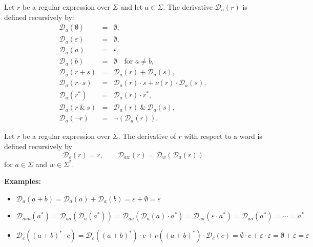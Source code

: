 \begin{definition}\label{def:regex-symbol-derivative}
Let \(r\) be a regular expression over \(\Sigma\) and let \(a\in\Sigma\).
The derivative \(\mathcal D_a(r)\) is defined recursively by:
\[
\begin{array}{rcl}
    \mathcal{D}_a(\emptyset) &=& \emptyset,\\[0.5ex]
    \mathcal{D}_a(\varepsilon) &=& \emptyset,\\[0.5ex]
    \mathcal{D}_a(a) &=& \varepsilon,\\[0.5ex]
    \mathcal{D}_a(b) &=& \emptyset \quad \text{for } a\neq b,\\[0.5ex]
    \mathcal{D}_a(r+s) &=& \mathcal{D}_a(r)+\mathcal{D}_a(s),\\[0.5ex]
    \mathcal{D}_a(r\cdot s) &=& \mathcal{D}_a(r)\cdot s + \nu(r)\cdot \mathcal{D}_a(s),\\[0.5ex]
    \mathcal{D}_a(r^*) &=& \mathcal{D}_a(r)\cdot r^*,\\[0.5ex]
    \mathcal{D}_a(r\:\&\:s) &=& \mathcal{D}_a(r)\:\&\:\mathcal{D}_a(s),\\[0.5ex]
    \mathcal{D}_a(\neg r) &=& \neg(\mathcal{D}_a(r)).
\end{array}
\]
\end{definition}

\begin{definition}\label{def:regex-derivative}
Let \(r\) be a regular expression over \(\Sigma\). The derivative of \(r\) with
respect to a word is defined recursively by
\[
     \mathcal{D}_\varepsilon(r)=r,
     \qquad
     \mathcal{D}_{aw}(r)=\mathcal{D}_w(\mathcal{D}_a(r))
\]
for \(a\in\Sigma\) and \(w\in\Sigma^*\).
\end{definition}

\textbf{Examples:}
\begin{itemize}
    \item $\mathcal{D}_a(a+b)=\mathcal{D}_a(a) + \mathcal{D}_a(b)=\varepsilon+\emptyset=\varepsilon$
    \item $\mathcal{D}_{aaa}(a^*)=\mathcal{D}_{aa}(\mathcal{D}_a(a^*))=\mathcal{D}_{aa}(\mathcal{D}_a(a)\cdot a^*)=\mathcal{D}_{aa}(\varepsilon \cdot a^*)=\mathcal{D}_{aa}(a^*)=\cdots=a^*$
    \item $\mathcal{D}_c\left(\left(a+b\right)^*\cdot c\right)= \mathcal{D}_c((a+b)^*)\cdot c + \nu((a+b)^*)\cdot \mathcal{D}_c(c)= \emptyset \cdot c + \varepsilon \cdot \varepsilon= \emptyset+ \varepsilon=\varepsilon$
\end{itemize}

